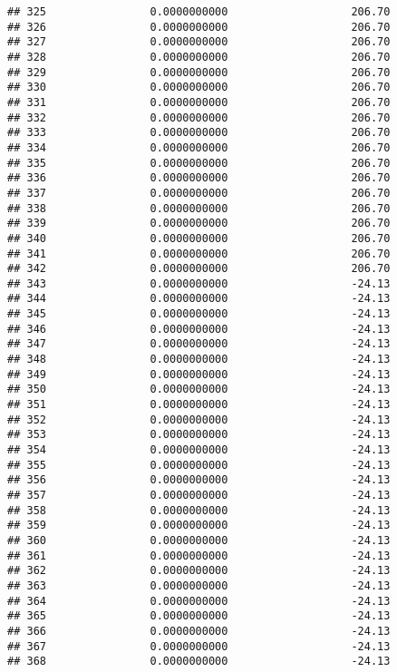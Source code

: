 \documentclass[]{article}
\begin{document}
\begin{verbatim}
## 325                0.0000000000                   206.70
## 326                0.0000000000                   206.70
## 327                0.0000000000                   206.70
## 328                0.0000000000                   206.70
## 329                0.0000000000                   206.70
## 330                0.0000000000                   206.70
## 331                0.0000000000                   206.70
## 332                0.0000000000                   206.70
## 333                0.0000000000                   206.70
## 334                0.0000000000                   206.70
## 335                0.0000000000                   206.70
## 336                0.0000000000                   206.70
## 337                0.0000000000                   206.70
## 338                0.0000000000                   206.70
## 339                0.0000000000                   206.70
## 340                0.0000000000                   206.70
## 341                0.0000000000                   206.70
## 342                0.0000000000                   206.70
## 343                0.0000000000                   -24.13
## 344                0.0000000000                   -24.13
## 345                0.0000000000                   -24.13
## 346                0.0000000000                   -24.13
## 347                0.0000000000                   -24.13
## 348                0.0000000000                   -24.13
## 349                0.0000000000                   -24.13
## 350                0.0000000000                   -24.13
## 351                0.0000000000                   -24.13
## 352                0.0000000000                   -24.13
## 353                0.0000000000                   -24.13
## 354                0.0000000000                   -24.13
## 355                0.0000000000                   -24.13
## 356                0.0000000000                   -24.13
## 357                0.0000000000                   -24.13
## 358                0.0000000000                   -24.13
## 359                0.0000000000                   -24.13
## 360                0.0000000000                   -24.13
## 361                0.0000000000                   -24.13
## 362                0.0000000000                   -24.13
## 363                0.0000000000                   -24.13
## 364                0.0000000000                   -24.13
## 365                0.0000000000                   -24.13
## 366                0.0000000000                   -24.13
## 367                0.0000000000                   -24.13
## 368                0.0000000000                   -24.13

\end{verbatim}
\end{document}
